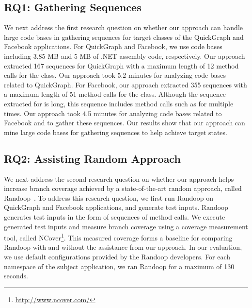 \documentclass{sig-alternate}
\begin{document}
\subsection{RQ1: Gathering Sequences}

We next address the first research question on whether our approach can handle large code bases in gathering sequences for target classes of the QuickGraph and Facebook applications. For QuickGraph and Facebook, we use code bases including 3.85 MB and 5 MB of .NET assembly code, respectively. Our approach extracted 167 sequences for QuickGraph with a maximum length of 12 method calls for the  class. Our approach took 5.2 minutes for analyzing code bases related to QuickGraph. For Facebook, our approach extracted 355 sequences with a maximum length of 51 method calls for the  class.  Although the sequence extracted for  is long, this sequence includes method calls such as  for multiple times. Our approach took 4.5 minutes for analyzing code bases related to Facebook and to gather these sequences. Our results show that our approach can mine large code bases for gathering sequences to help achieve target states.

\subsection{RQ2: Assisting Random Approach}

We next address the second research question on whether our approach helps increase branch coverage achieved by a state-of-the-art random approach, called Randoop~\cite{pacheco:feedback}. To address this research question, we first run Randoop on QuickGraph and Facebook applications, and generate test inputs. Randoop generates test inputs in the form of sequences of method calls. We execute generated test inputs and measure branch coverage using a coverage measurement tool, called NCover\footnote{\url{http://www.ncover.com/}}. This measured coverage forms a baseline for comparing Randoop with and without the assistance from our approach. In our evaluation, we use default configurations provided by the Randoop developers. For each namespace of the subject application, we ran Randoop for a maximum of 130 seconds.
\end{document}
